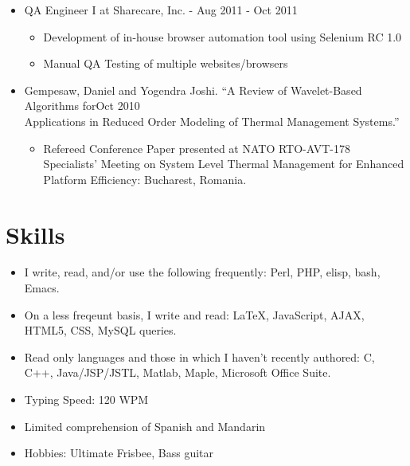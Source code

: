 \documentclass[10pt]{article}
\newenvironment{myitem}{
\begin{itemize}
  \setlength{\itemsep}{1pt}
  \setlength{\parskip}{0pt}
  \setlength{\parsep}{0pt}
}{\end{itemize}}
\begin{document}
\begin{myitem}
\begin{myitem}
  \item QA Engineer I at Sharecare, Inc. - \hfill Aug 2011 - Oct 2011
  \begin{myitem}
    \item Development of in-house browser automation tool using Selenium RC 1.0
    \item Manual QA Testing of multiple websites/browsers
  \end{myitem}

  \item Gempesaw, Daniel and Yogendra Joshi. ``A Review of Wavelet-Based Algorithms for\hfill Oct 2010\\
Applications in Reduced Order Modeling of Thermal Management Systems.''
  \begin{myitem}
    \item Refereed Conference Paper presented at NATO RTO-AVT-178 Specialists' Meeting on System Level Thermal Management for Enhanced Platform Efficiency: Bucharest, Romania.
  \end{myitem}
\end{myitem}

\vspace{-.55cm}
\section{Skills}
\vspace{-0.25cm}
\begin{myitem}
\item I write, read, and/or use the following frequently: Perl, PHP, elisp, bash, Emacs.
\item On a less freqeunt basis, I write and read: \LaTeX, JavaScript, AJAX, HTML5, CSS, MySQL queries.
\item Read only languages and those in which I haven't recently authored: C, C++, Java/JSP/JSTL, Matlab, Maple, Microsoft Office Suite.
\item Typing Speed: 120 WPM
\item Limited comprehension of Spanish and Mandarin
\item Hobbies: Ultimate Frisbee, Bass guitar
\end{myitem}


\end{myitem}
\end{document}
